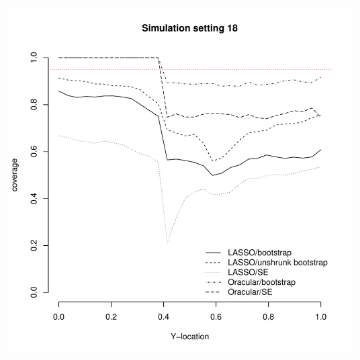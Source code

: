 \documentclass[authoryear, review, 11pt]{elsarticle}
\begin{document}
\begin{figure}
\begin{subfigure}[b]{0.3\textwidth}
			\label{fig:tiger}
		\end{subfigure}
        ~ %
		\begin{subfigure}[b]{0.3\textwidth}
			\centering
			\includegraphics[width=\textwidth]{../../figures/simulation/28-18-profile-coverage.pdf}
			\label{fig:mouse}
		\end{subfigure}
	\end{figure}	
	
	
	
	
	
\end{document}
